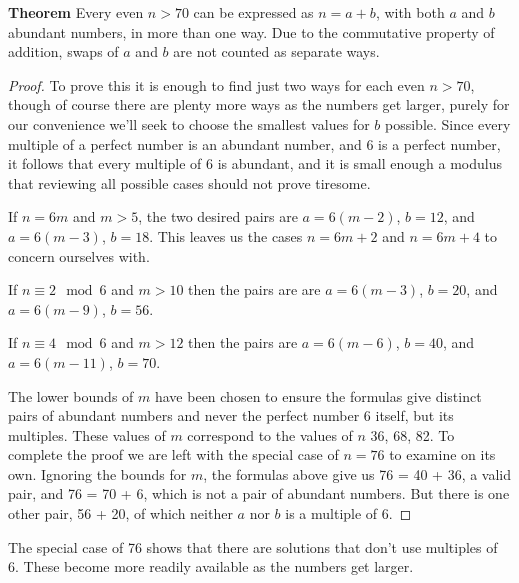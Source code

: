 \documentclass[12pt]{article}
\begin{document}
{\bf Theorem} Every even $n > 70$ can be expressed as $n = a + b$, with both $a$ and $b$ abundant numbers, in more than one way. Due to the commutative property of addition, swaps of $a$ and $b$ are not counted as separate ways.

\begin{proof}
To prove this it is enough to find just two ways for each even $n > 70$, though of course there are plenty more ways as the numbers get larger, purely for our convenience we'll seek to choose the smallest values for $b$ possible. Since every multiple of a perfect number is an abundant number, and 6 is a perfect number, it follows that every multiple of 6 is abundant, and it is small enough a modulus that reviewing all possible cases should not prove tiresome.

If $n = 6m$ and $m > 5$, the two desired pairs are $a = 6(m - 2)$, $b = 12$, and $a = 6(m - 3)$, $b = 18$. This leaves us the cases $n = 6m + 2$ and $n = 6m + 4$ to concern ourselves with.

If $n \equiv 2 \mod 6$ and $m > 10$ then the pairs are are $a = 6(m - 3)$, $b = 20$, and $a = 6(m - 9)$, $b = 56$.

If $n \equiv 4 \mod 6$ and $m > 12$ then the pairs are $a = 6(m - 6)$, $b = 40$, and $a = 6(m - 11)$, $b = 70$.

The lower bounds of $m$ have been chosen to ensure the formulas give distinct pairs of abundant numbers and never the perfect number 6 itself, but its multiples. These values of $m$ correspond to the values of $n$ 36, 68, 82. To complete the proof we are left with the special case of $n = 76$ to examine on its own. Ignoring the bounds for $m$, the formulas above give us 76 = 40 + 36, a valid pair, and 76 = 70 + 6, which is not a pair of abundant numbers. But there is one other pair, 56 + 20, of which neither $a$ nor $b$ is a multiple of 6.
\end{proof}

The special case of 76 shows that there are solutions that don't use multiples of 6. These become more readily available as the numbers get larger.
\end{document}
